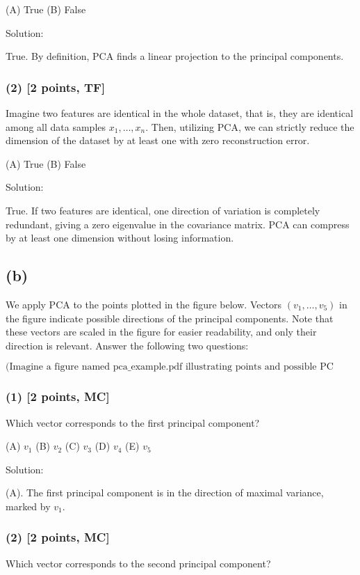 \documentclass[twocolumn]{article}
\begin{document}
\begin{spacing}{1}
(A) True \quad (B) False

Solution:

True. By definition, PCA finds a linear projection to the principal components.

\subsubsection*{(2) [2 points, TF]}
Imagine two features are identical in the whole dataset, that is, they are identical among all data samples \(x_1,\ldots,x_n\). Then, utilizing PCA, we can strictly reduce the dimension of the dataset by at least one with zero reconstruction error.

(A) True \quad (B) False

Solution:

True. If two features are identical, one direction of variation is completely redundant, giving a zero eigenvalue in the covariance matrix. PCA can compress by at least one dimension without losing information.

\subsection*{(b)}
We apply PCA to the points plotted in the figure below. Vectors \((v_1,\ldots,v_5)\) in the figure indicate possible directions of the principal components. Note that these vectors are scaled in the figure for easier readability, and only their direction is relevant. Answer the following two questions:

\[
\text{(Imagine a figure named pca\_example.pdf illustrating points and possible PC directions.)}
\]

\subsubsection*{(1) [2 points, MC]}
Which vector corresponds to the first principal component?

(A) \(v_1\) \quad (B) \(v_2\) \quad (C) \(v_3\) \quad (D) \(v_4\) \quad (E) \(v_5\)

Solution:

(A). The first principal component is in the direction of maximal variance, marked by \(v_1\).

\subsubsection*{(2) [2 points, MC]}
Which vector corresponds to the second principal component?


\end{spacing}
\end{document}
